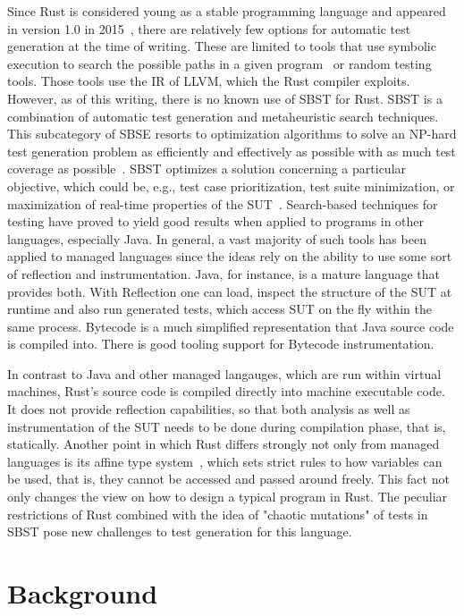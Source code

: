 \documentclass{article}
\begin{document}
Since Rust is considered young as a stable programming language and appeared in version 1.0 in 2015~\cite{Rust10}, there are relatively few options for automatic test generation at the time of writing. These are limited to tools that use symbolic execution to search the possible paths in a given program~\cite{cadar2008klee} or random testing tools. Those tools use the \ac{IR} of LLVM, which the Rust compiler exploits. However, as of this writing, there is no known use of \ac{SBST} for Rust. \ac{SBST} is a combination of automatic test generation and metaheuristic search techniques. This subcategory of \ac{SBSE} resorts to optimization algorithms to solve an NP-hard test generation problem as efficiently and effectively as possible with as much test coverage as possible~\cite{Khari2019}. \ac{SBST} optimizes a solution concerning a particular objective, which could be, e.g., test case prioritization, test suite minimization, or maximization of real-time properties of the \ac{SUT}~\cite{Khari2019}. Search-based techniques for testing have proved to yield good results when applied to programs in other languages, especially Java. In general, a vast majority of such tools has been applied to managed languages since the ideas rely on the ability to use some sort of reflection and instrumentation. Java, for instance, is a mature language that provides both. With Reflection one can load, inspect the structure of the \ac{SUT} at runtime and also run generated tests, which access \ac{SUT} on the fly within the same process. Bytecode is a much simplified representation that Java source code is compiled into. There is good tooling support for Bytecode instrumentation. 

In contrast to Java and other managed langauges, which are run within virtual machines, Rust's source code is compiled directly into machine executable code. It does not provide reflection capabilities, so that both analysis as well as instrumentation of the \ac{SUT} needs to be done during compilation phase, that is, statically. Another point in which Rust differs strongly not only from managed languages is its affine type system~\cite{Anderson2016}, which sets strict rules to how variables can be used, that is, they cannot be accessed and passed around freely. This fact not only changes the view on how to design a typical program in Rust. The peculiar restrictions of Rust combined with the idea of "chaotic mutations" of tests in SBST pose new challenges to test generation for this language.

\section{Background}
\end{document}
